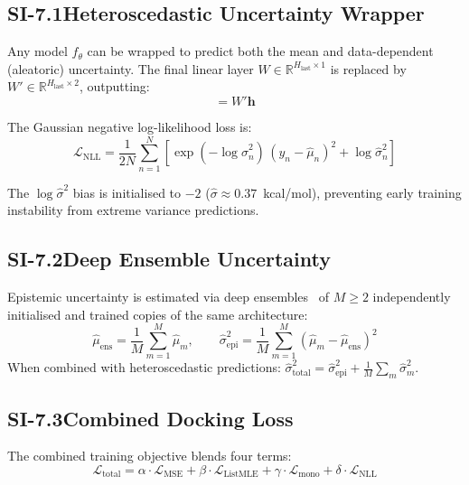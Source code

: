 \documentclass[11pt]{article}
\begin{document}
\subsection*{SI-7.1\quad Heteroscedastic Uncertainty Wrapper}

Any model $f_\theta$ can be wrapped to predict both the mean and data-dependent
(aleatoric) uncertainty.
The final linear layer $W \in \mathbb{R}^{H_{\mathrm{last}} \times 1}$ is
replaced by $W' \in \mathbb{R}^{H_{\mathrm{last}} \times 2}$, outputting:
\begin{equation}
  [\hat{\mu},\; \log\hat{\sigma}^2] = W' \mathbf{h}
  \label{eq:hetero_out}
\end{equation}

The Gaussian negative log-likelihood loss is:
\begin{equation}
  \mathcal{L}_{\mathrm{NLL}} = \frac{1}{2N}
  \sum_{n=1}^{N} \left[
    \exp(-\log\hat{\sigma}_n^2)\,
    (y_n - \hat{\mu}_n)^2
    + \log\hat{\sigma}_n^2
  \right]
  \label{eq:nll}
\end{equation}

The $\log\hat{\sigma}^2$ bias is initialised to $-2$
($\hat{\sigma} \approx 0.37$~kcal/mol), preventing early training
instability from extreme variance predictions.

\subsection*{SI-7.2\quad Deep Ensemble Uncertainty}

Epistemic uncertainty is estimated via deep ensembles~\cite{lakshminarayanan2017simple}
of $M \geq 2$ independently initialised and trained copies of the same architecture:
\begin{equation}
  \hat{\mu}_{\mathrm{ens}} = \frac{1}{M}\sum_{m=1}^{M} \hat{\mu}_m, \qquad
  \hat{\sigma}_{\mathrm{epi}}^2 = \frac{1}{M}\sum_{m=1}^{M}
  (\hat{\mu}_m - \hat{\mu}_{\mathrm{ens}})^2
  \label{eq:ensemble}
\end{equation}
When combined with heteroscedastic predictions:
$\hat{\sigma}_{\mathrm{total}}^2 = \hat{\sigma}_{\mathrm{epi}}^2
+ \frac{1}{M}\sum_m \hat{\sigma}_m^2$.

\subsection*{SI-7.3\quad Combined Docking Loss}

The combined training objective blends four terms:
\begin{equation}
  \mathcal{L}_{\mathrm{total}} = \alpha \cdot \mathcal{L}_{\mathrm{MSE}}
  + \beta \cdot \mathcal{L}_{\mathrm{ListMLE}}
  + \gamma \cdot \mathcal{L}_{\mathrm{mono}}
  + \delta \cdot \mathcal{L}_{\mathrm{NLL}}
  \label{eq:combined_loss}
\end{equation}
\end{document}
